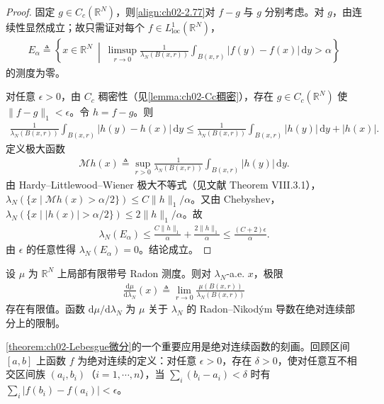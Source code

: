 \documentclass[../../main.tex]{subfiles}%
\begin{document}
\begin{proof}
固定 $g\in C_c(\mathbb R^N)$，则\eqref{align:ch02-2.77}对 $f-g$ 与 $g$ 分别考虑。对 $g$，由连续性显然成立；故只需证对每个 $f\in L^1_{\mathrm{loc}}(\mathbb R^N)$，
\begin{align*}
E_\alpha\triangleq \left\{x\in\mathbb R^N\ \middle|\ \limsup_{r\to0}\frac1{\lambda_N(B(x,r))}\int_{B(x,r)}|f(y)-f(x)|\,\mathrm{d}y>\alpha\right\}
\end{align*}
的测度为零。

对任意 $\epsilon>0$，由 $C_c$ 稠密性（见\cref{lemma:ch02-Cc稠密}），存在 $g\in C_c(\mathbb R^N)$ 使 $\|f-g\|_1<\epsilon$。令 $h=f-g$。则
\begin{align*}
\frac1{\lambda_N(B(x,r))}\int_{B(x,r)}|h(y)-h(x)|\,\mathrm{d}y
\leqslant\frac1{\lambda_N(B(x,r))}\int_{B(x,r)}|h(y)|\,\mathrm{d}y+|h(x)|.
\end{align*}
定义极大函数
\begin{align*}
\mathcal M h(x)\triangleq \sup_{r>0}\frac1{\lambda_N(B(x,r))}\int_{B(x,r)}|h(y)|\,\mathrm{d}y.
\end{align*}
由 Hardy--Littlewood--Wiener 极大不等式（见文献\cite{ref40} Theorem VIII.3.1），$\lambda_N(\{x\mid\mathcal M h(x)>\alpha/2\})\leqslant C\|h\|_1/\alpha$。又由 Chebyshev，$\lambda_N(\{x\mid|h(x)|>\alpha/2\})\leqslant2\|h\|_1/\alpha$。故
\begin{align*}
\lambda_N(E_\alpha)\leqslant\frac{C\|h\|_1}{\alpha}+\frac{2\|h\|_1}{\alpha}\leqslant\frac{(C+2)\epsilon}{\alpha}.
\end{align*}
由 $\epsilon$ 的任意性得 $\lambda_N(E_\alpha)=0$。结论成立。
\end{proof}

\begin{corollary}\label{corollary:ch02-带号Radon微分}
设 $\mu$ 为 $\mathbb R^N$ 上局部有限带号 Radon 测度。则对 $\lambda_N$-a.e. $x$，极限
\begin{align*}
\frac{\mathrm{d}\mu}{\mathrm{d}\lambda_N}(x)\triangleq \lim_{r\to0}\frac{\mu(B(x,r))}{\lambda_N(B(x,r))}
\end{align*}
存在有限值。函数 $\mathrm{d}\mu/\mathrm{d}\lambda_N$ 为 $\mu$ 关于 $\lambda_N$ 的 Radon--Nikod\'ym 导数在绝对连续部分上的限制。
\end{corollary}

\cref{theorem:ch02-Lebesgue微分}的一个重要应用是绝对连续函数的刻画。回顾区间 $[a,b]$ 上函数 $f$ 为绝对连续的定义：对任意 $\epsilon>0$，存在 $\delta>0$，使对任意互不相交区间族 $(a_i,b_i)$（$i=1,\cdots ,n$），当 $\sum_i(b_i-a_i)<\delta$ 时有 $\sum_i|f(b_i)-f(a_i)|<\epsilon$。
\end{document}
